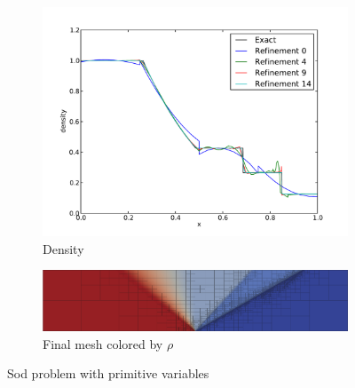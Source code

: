 \documentclass[Dissertation.tex]{subfiles}
\begin{document}
\begin{figure}[ht]
\centering
\begin{subfigure}[t]{\textwidth}
\centering
\includegraphics[width=\textwidth]{Dissertation/Sod/FormulationComparison/primitive-den.pdf}
\caption{Density}
\end{subfigure}
\begin{subfigure}[t]{0.9\textwidth}
\centering
\includegraphics[width=\textwidth]{Sod/FormulationComparison/Form0Mesh15.png}
\caption{Final mesh colored by $\rho$}
\end{subfigure}
\caption{Sod problem with primitive variables}
\label{fig:SodPrimitive}
\end{figure}
\end{document}
